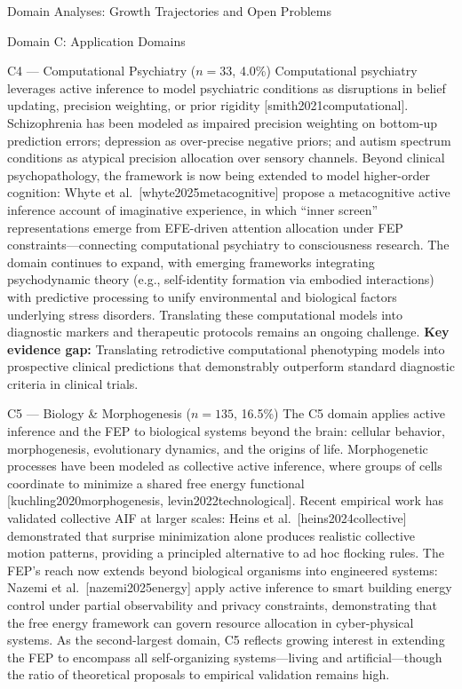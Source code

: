 \documentclass[
  ignorenonframetext,
]{beamer}
\providecommand{\citep}[1]{[#1]}
\begin{document}
\begin{frame}[allowframebreaks]{Domain Analyses: Growth Trajectories and
Open Problems \label{sec:subfield_analyses}}
\begin{block}{Domain C: Application Domains}
\begin{block}{C4 --- Computational Psychiatry (\(n = 33\), 4.0\%)}
\protect{}\label{c4-computational-psychiatry-n-33-4.0}
Computational psychiatry leverages active inference to model psychiatric
conditions as disruptions in belief updating, precision weighting, or
prior rigidity \citep{smith2021computational}. Schizophrenia has been
modeled as impaired precision weighting on bottom-up prediction errors;
depression as over-precise negative priors; and autism spectrum
conditions as atypical precision allocation over sensory channels.
Beyond clinical psychopathology, the framework is now being extended to
model higher-order cognition: Whyte et
al.~\citep{whyte2025metacognitive} propose a metacognitive active
inference account of imaginative experience, in which ``inner screen''
representations emerge from EFE-driven attention allocation under FEP
constraints---connecting computational psychiatry to consciousness
research. The domain continues to expand, with emerging frameworks
integrating psychodynamic theory (e.g., self-identity formation via
embodied interactions) with predictive processing to unify environmental
and biological factors underlying stress disorders. Translating these
computational models into diagnostic markers and therapeutic protocols
remains an ongoing challenge. \textbf{Key evidence gap:} Translating
retrodictive computational phenotyping models into prospective clinical
predictions that demonstrably outperform standard diagnostic criteria in
clinical trials.
\end{block}

\begin{block}{C5 --- Biology \& Morphogenesis (\(n = 135\), 16.5\%)}
\protect{}\label{c5-biology-morphogenesis-n-135-16.5}
The C5 domain applies active inference and the FEP to biological systems
beyond the brain: cellular behavior, morphogenesis, evolutionary
dynamics, and the origins of life. Morphogenetic processes have been
modeled as collective active inference, where groups of cells coordinate
to minimize a shared free energy functional
\citep{kuchling2020morphogenesis, levin2022technological}. Recent
empirical work has validated collective AIF at larger scales: Heins et
al.~\citep{heins2024collective} demonstrated that surprise minimization
alone produces realistic collective motion patterns, providing a
principled alternative to ad hoc flocking rules. The FEP's reach now
extends beyond biological organisms into engineered systems: Nazemi et
al.~\citep{nazemi2025energy} apply active inference to smart building
energy control under partial observability and privacy constraints,
demonstrating that the free energy framework can govern resource
allocation in cyber-physical systems. As the second-largest domain, C5
reflects growing interest in extending the FEP to encompass all
self-organizing systems---living and artificial---though the ratio of
theoretical proposals to empirical validation remains high.
\end{block}
\end{block}


\end{frame}
\end{document}
